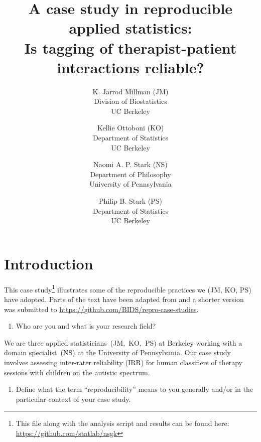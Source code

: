 \documentclass[]{article}
\date{}
\begin{document}
\title{A case study in reproducible applied statistics:\\
Is tagging of therapist-patient interactions reliable?
}

\author{K. Jarrod Millman (JM)\\ Division of Biostatistics\\ UC Berkeley \and
Kellie Ottoboni (KO)\\ Department of Statistics\\ UC Berkeley \and
Naomi A. P. Stark (NS)\\ Department of Philosophy\\ University of Pennsylvania \and
Philip B. Stark (PS)\\ Department of Statistics\\ UC Berkeley
}

\maketitle


\section{Introduction}

This case study\footnote{This file along with the analysis script and results
can be found here: \url{https://github.com/statlab/nsgk}} illustrates some of
the reproducible practices we (JM, KO, PS) have adopted.
Parts of the text have been adapted from \citet{millman2015thesis} and a
shorter version was submitted to
\url{https://github.com/BIDS/repro-case-studies}.


\begin{enumerate}
\def\labelenumi{\arabic{enumi})}
\itemsep1pt\parskip0pt
\item
  Who are you and what is your research field?
\end{enumerate}

We are three applied statisticians~(JM,~KO,~PS) at Berkeley working with a
domain specialist~(NS) at the University of Pennsylvania.
Our case study involves assessing inter-rater reliability (IRR) for human
classifiers of therapy sessions with children on the autistic spectrum.

\begin{enumerate}
\def\labelenumi{\arabic{enumi})}
\setcounter{enumi}{1}
\itemsep1pt\parskip0pt
\item
  Define what the term ``reproducibility'' means to you generally and/or
  in the particular context of your case study.
\end{enumerate}
\end{document}
